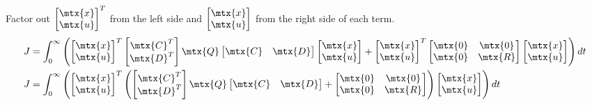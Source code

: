 Factor out $\begin{bmatrix}\mtx{x} \\ \mtx{u}\end{bmatrix}^T$ from the left side
and $\begin{bmatrix}\mtx{x} \\ \mtx{u}\end{bmatrix}$ from the right side of each
term.
\begin{align*}
  J &= \int_0^\infty \left(
    \begin{bmatrix}
      \mtx{x} \\
      \mtx{u}
    \end{bmatrix}^T
    \begin{bmatrix}
      \mtx{C}^T \\
      \mtx{D}^T
    \end{bmatrix}
    \mtx{Q}
    \begin{bmatrix}
      \mtx{C} &
      \mtx{D}
    \end{bmatrix}
    \begin{bmatrix}
      \mtx{x} \\
      \mtx{u}
    \end{bmatrix} +
    \begin{bmatrix}
      \mtx{x} \\
      \mtx{u}
    \end{bmatrix}^T
    \begin{bmatrix}
      \mtx{0} & \mtx{0} \\
      \mtx{0} & \mtx{R}
    \end{bmatrix}
    \begin{bmatrix}
      \mtx{x} \\
      \mtx{u}
    \end{bmatrix}
    \right) dt \\
  J &= \int_0^\infty \left(
    \begin{bmatrix}
      \mtx{x} \\
      \mtx{u}
    \end{bmatrix}^T
    \left(
    \begin{bmatrix}
      \mtx{C}^T \\
      \mtx{D}^T
    \end{bmatrix}
    \mtx{Q}
    \begin{bmatrix}
      \mtx{C} &
      \mtx{D}
    \end{bmatrix} +
    \begin{bmatrix}
      \mtx{0} & \mtx{0} \\
      \mtx{0} & \mtx{R}
    \end{bmatrix}
    \right)
    \begin{bmatrix}
      \mtx{x} \\
      \mtx{u}
    \end{bmatrix}
    \right) dt
\end{align*}


